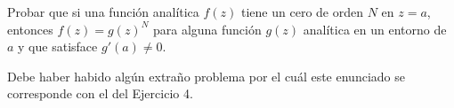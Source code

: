 \documentclass[twoside]{article}
\begin{document}
\begin{ejercicio}{8}

\end{ejercicio}
\begin{solucion}

\end{solucion}
\newpage


\begin{ejercicio}{9}
Probar que si una función analítica $f(z)$ tiene un cero de orden $N$ en $z=a$, entonces $f(z)=g(z)^N$ para alguna función $g(z)$ analítica en un entorno de $a$ y que satisface $g'(a)\neq 0$.
\end{ejercicio}
\begin{solucion}
Debe haber habido algún extraño problema por el cuál este enunciado se corresponde con el del Ejercicio 4.
\end{solucion}
\newpage


\begin{ejercicio}{10}

\end{ejercicio}
\begin{solucion}

\end{solucion}
\newpage
\end{document}
